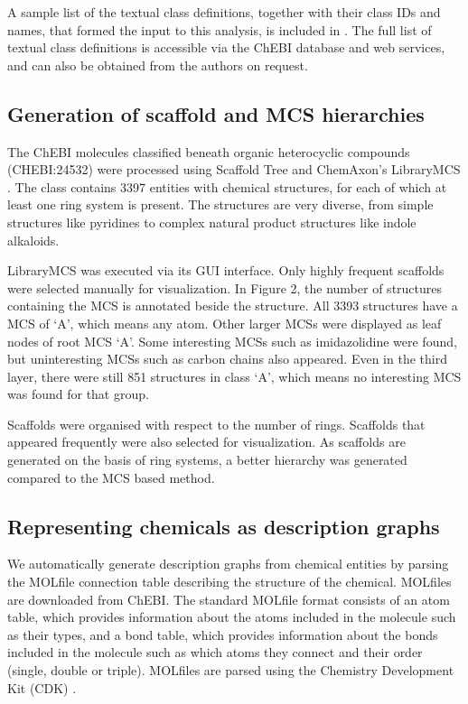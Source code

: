 \documentclass[10pt]{bmc_article}
\newenvironment{bmcformat}{\baselineskip20pt\sloppy\setboolean{publ}{false}}{\baselineskip20pt\sloppy}
\begin{document}
\begin{bmcformat}
A sample list of the textual class definitions, together with their class IDs and names, that formed the input to this analysis, is included in \textit{}. The full list of textual class definitions is accessible via the ChEBI database and web services, and can also be obtained from the authors on request. 

\subsection*{Generation of scaffold and MCS hierarchies}

The ChEBI molecules classified beneath organic heterocyclic compounds (CHEBI:24532) were processed using Scaffold Tree \cite{Schuffenhauer2007} and ChemAxon's LibraryMCS \cite{librarymcs}. The class contains 3397 entities with chemical structures, for each of which at least one ring system is present. The structures are very diverse, from simple structures like pyridines to complex natural product structures like indole alkaloids. 

LibraryMCS was executed via its GUI interface. Only highly frequent scaffolds were selected manually for visualization. In Figure 2, the number of structures containing the MCS is annotated beside the structure. All 3393 structures have a MCS of `A', which means any atom. Other larger MCSs were displayed as leaf nodes of root MCS `A'. Some interesting MCSs such as imidazolidine were found, but uninteresting MCSs such as carbon chains also appeared. Even in the third layer, there were still 851 structures in class `A', which means no interesting MCS was found for that group.

Scaffolds were organised with respect to the number of rings. Scaffolds that appeared frequently were also selected for visualization. As scaffolds are generated on the basis of ring systems, a better hierarchy was generated compared to the MCS based method.


\subsection*{Representing chemicals as description graphs}

We automatically generate description graphs from chemical entities by parsing the MOLfile \cite{sdf} connection table describing the structure of the chemical. MOLfiles are downloaded from ChEBI. The standard MOLfile format consists of an atom table, which provides information about the atoms included in the molecule such as their types, and a bond table, which provides information about the bonds included in the molecule such as which atoms they connect and their order (single, double or triple). MOLfiles are parsed using the Chemistry Development Kit (CDK) \cite{cdk2006}.


\end{bmcformat}
\end{document}
